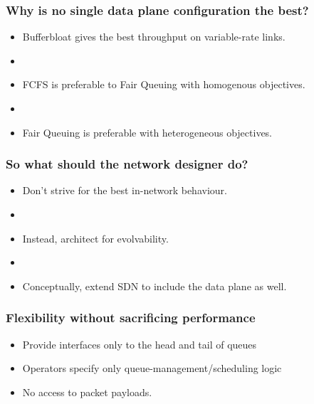 \begin{Large}
\begin{frame}[plain]
\end{frame}

\begin{frame}[plain]
\frametitle{Why is no single data plane configuration the best?}
\begin{itemize}
\item Bufferbloat gives the best throughput on variable-rate links.
\item[] 

\item FCFS is preferable to Fair Queuing with homogenous objectives.

\item[]

\item Fair Queuing is preferable with heterogeneous objectives.
\end{itemize}
\end{frame}

\begin{frame}[plain]
\frametitle{So what should the network designer do?}
\begin{itemize}
\item Don't strive for the best in-network behaviour.
\item []
\item Instead, architect for evolvability. 
\item []
\item Conceptually, extend SDN to include the data plane as well.
\end{itemize}
\end{frame}

\begin{frame}[plain]
\frametitle{Flexibility without sacrificing performance}


\begin{itemize}
\item Provide interfaces only to the head and tail of queues
\item Operators specify only queue-management/scheduling logic
\item No access to packet payloads.
\end{itemize}
\end{frame}


\end{Large}
